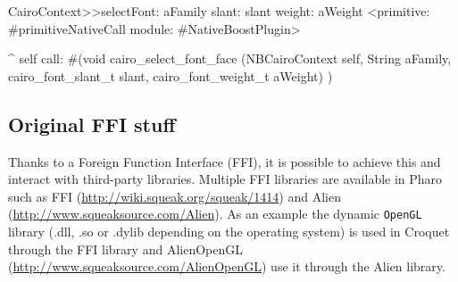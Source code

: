 \documentclass[a4paper,10pt,twoside]{book}
\begin{document}
\begin{code}{}
CairoContext>>selectFont: aFamily slant: slant weight: aWeight
	<primitive: #primitiveNativeCall module: #NativeBoostPlugin>
	
	^ self call: #(void cairo_select_font_face (NBCairoContext self,
                                                         String aFamily,
                                                         cairo_font_slant_t slant,
                                                         cairo_font_weight_t aWeight) )
\end{code}

% 
% 
% 

\newpage
\subsection{Original FFI stuff}

Thanks to a Foreign Function Interface (FFI), it is possible to achieve this and interact with third-party libraries.
Multiple FFI libraries are available in Pharo such as FFI (\url{http://wiki.squeak.org/squeak/1414}) and Alien (\url{http://www.squeaksource.com/Alien}).
As an example the dynamic \texttt{OpenGL} library (.dll, .so or .dylib depending on the operating system) is used in Croquet through the FFI library and AlienOpenGL (\url{http://www.squeaksource.com/AlienOpenGL}) use it through the Alien library.
\end{document}
